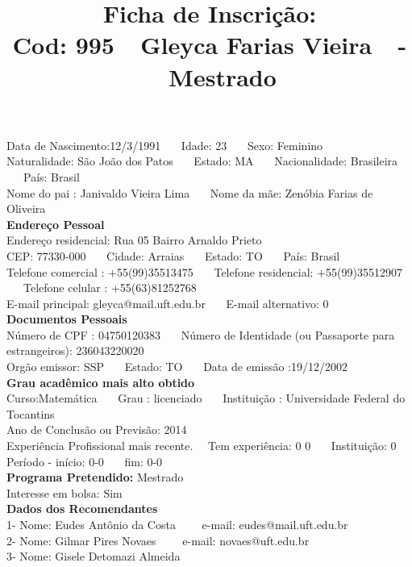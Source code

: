 \documentclass[11pt]{article}
\title{\vspace*{-4cm} Ficha de Inscrição: \\Cod: 995\ \ Gleyca Farias Vieira\ \ - \ \ Mestrado 
 }
\date{}
\begin{document}
\maketitle
\vspace*{-1.5cm}
\noindent Data de Nascimento:12/3/1991
\ \ \ Idade: 23   \ \ \ Sexo: Feminino
\\
Naturalidade: São João dos Patos  
\ \ \  Estado: MA
\ \ \  Nacionalidade: Brasileira
\ \ \ País: Brasil
\\        
Nome do pai : Janivaldo Vieira Lima
\ \ \ Nome da mãe: Zenóbia Farias de Oliveira          
\\[0.2cm]                     
\textbf{Endereço Pessoal} 
\\ 
\noindent Endereço residencial: Rua 05 Bairro Arnaldo Prieto
\\
        CEP: 77330-000 
\ \ \ Cidade: Arraias 
\ \ \ Estado: TO 
\ \ \ País: Brasil
\\		
		Telefone comercial : +55(99)35513475
\ \ \ Telefone residencial: +55(99)35512907
\ \ \ Telefone celular : +55(63)81252768
\\
E-mail principal: gleyca@mail.uft.edu.br
\ \ \ E-mail alternativo: 0 
\\[0.2cm] 
\textbf{Documentos Pessoais}
\\
\noindent Número de CPF : 04750120383
\ \ \ Número de Identidade (ou Passaporte para estrangeiros): 236043220020
\\
Orgão emissor: SSP
\ \ \ Estado: TO
\ \ \ Data de emissão :19/12/2002
\\[0.3cm]
\textbf{Grau acadêmico mais alto obtido}
\\	
Curso:Matemática
\ \ \ Grau : licenciado
\ \ \ Instituição : Universidade Federal do Tocantins
\\			
Ano de Conclusão ou Previsão: 2014
\\ 
Experiência Profissional mais recente. \ \  
Tem experiência: 0 0  
\ \ \ Instituição: 0
\\  
Período - início: 0-0
\ \ \ fim: 0-0
\\[0.2cm] 
\textbf{Programa Pretendido:} Mestrado\\
Interesse em bolsa: Sim
\\[0.3cm]		
\textbf{Dados dos Recomendantes} 
\\
1- Nome: Eudes Antônio da Costa
\ \ \ \  e-mail: eudes@mail.uft.edu.br 
\\
2- Nome: Gilmar Pires Novaes
\ \ \ \ e-mail: novaes@uft.edu.br
\\
3- Nome: Gisele Detomazi Almeida
\end{document}
